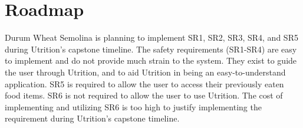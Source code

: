 \documentclass{article}
\begin{document}
\section{Roadmap}


Durum Wheat Semolina is planning to implement SR1, SR2, SR3, SR4, and SR5 during Utrition's capstone timeline. The safety requirements (SR1-SR4) are easy to implement and do not provide much strain to the system. They exist to guide the user through Utrition, and to aid Utrition in being an easy-to-understand application. SR5 is required to allow the user to access their previously eaten food items. SR6 is not required to allow the user to use Utrition. The cost of implementing and utilizing SR6 is too high to justify implementing the requirement during Utrition's capstone timeline.
	
\end{document}
